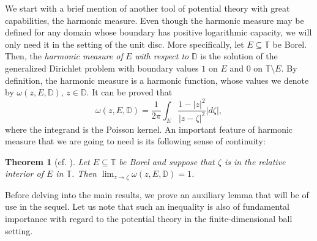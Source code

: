 \documentclass[12pt]{amsart}
\newtheorem{theorem}{Theorem}[section]
\theoremstyle{definition}\newtheorem{remark}[theorem]{Remark}
\theoremstyle{definition}\newtheorem{example}[theorem]{Example}
\theoremstyle{definition}\newtheorem{definition}{Definition}
\numberwithin{equation}{section}
\newcommand\DD{{\mathbb D}}
\newcommand\TT{{\mathbb T}}
\begin{document}
We start with a brief mention of another tool of potential theory with great capabilities, the harmonic measure. Even though the harmonic measure may be defined for any domain whose boundary has positive logarithmic capacity, we will only need it in the setting of the unit disc. More specifically, let $E\subseteq\TT$ be Borel. Then, the \textit{harmonic measure of} $E$ \textit{with respect to} $\DD$ is the solution of the generalized Dirichlet problem with boundary values $1$ on $E$ and $0$ on $\TT\setminus E$. By definition, the harmonic measure is a harmonic function, whose values we denote by $\omega(z,E,\DD)$, $z\in\DD$. It can be proved that
\begin{equation}\label{eq:harmonic measure}
    \omega(z,E,\DD)=\frac{1}{2\pi}\int_{E}\frac{1-|z|^2}{|z-\zeta|^2}|d\zeta|,
\end{equation}
where the integrand is the Poisson kernel. An important feature of harmonic measure that we are going to need is its following sense of continuity:
\begin{theorem}[{cf. \cite[Theorem 4.3.4]{Ransford}}]\label{thm:harmonic measure}
    Let $E\subseteq\TT$ be Borel and suppose that $\zeta$ is in the relative interior of $E$ in $\TT$. Then $\lim_{z\to\zeta}\omega(z,E,\DD)=1$.
\end{theorem}


Before delving into the main results, we prove an auxiliary lemma that will be of use in the sequel. Let us note that such an inequality is also of fundamental importance with regard to the potential theory in the finite-dimensional ball setting.
\end{document}

